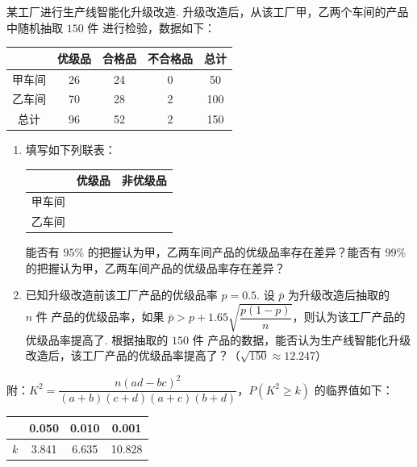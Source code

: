 \begin{problem}
某工厂进行生产线智能化升级改造. 升级改造后，从该工厂甲，乙两个车间的产品中随机抽取 \(150\text{ 件}\) 进行检验，数据如下：
\begin{center}
\begin{tabular}{c|ccc|c}
 & 优级品 & 合格品 & 不合格品 & 总计\\ \hline
甲车间 & 26 & 24 & 0 & 50\\
乙车间 & 70 & 28 & 2 & 100\\ \hline
总计 & 96 & 52 & 2 & 150
\end{tabular}
\end{center}
\begin{enumerate}
\item 填写如下列联表：
\begin{center}
\begin{tabular}{c|cc}
 & 优级品 & 非优级品\\ \hline
甲车间 &\fillinblank{} &\fillinblank{} \\
乙车间 &\fillinblank{} &\fillinblank{} \\
\end{tabular}
\end{center}
能否有 \(95\%\) 的把握认为甲，乙两车间产品的优级品率存在差异？能否有 \(99\%\) 的把握认为甲，乙两车间产品的优级品率存在差异？
\item 已知升级改造前该工厂产品的优级品率 \(p=0.5\). 设 \(\bar p\) 为升级改造后抽取的 \(n\text{ 件}\) 产品的优级品率，如果 \(\bar p>p+1.65\sqrt{\dfrac{p(1-p)}n}\)，则认为该工厂产品的优级品率提高了. 根据抽取的 \(150\text{ 件}\) 产品的数据，能否认为生产线智能化升级改造后，该工厂产品的优级品率提高了？（\(\sqrt{150}\approx12.247\)）
\end{enumerate}
附：\(K^2=\dfrac{n(ad-bc)^2}{(a+b)(c+d)(a+c)(b+d)}\)，\(P(K^2\ge k)\) 的临界值如下：
\begin{center}
\begin{tabular}{c|ccc}
 & 0.050 & 0.010 & 0.001\\ \hline
\(k\) & 3.841 & 6.635 & 10.828
\end{tabular}
\end{center}
\end{problem}


